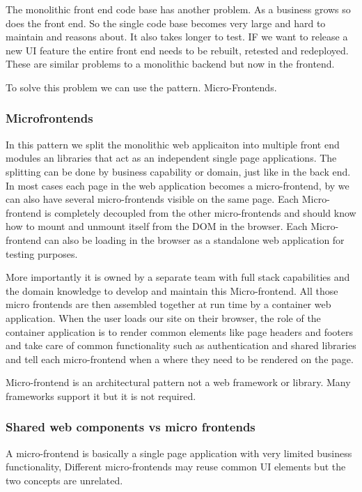 The monolithic front end code base has another problem.
As a business grows so does the front end.
So the single code base becomes very large and hard to maintain and reasons about.
It also takes longer to test.
IF we want to release a new UI feature the entire front end needs to be rebuilt, retested and redeployed.
These are similar problems to a monolithic backend but now in the frontend.

To solve this problem we can use the pattern.
Micro-Frontends.

\subsubsection{Microfrontends}
In this pattern we split the monolithic web applicaiton into multiple front end modules an libraries that act as an independent single page applications.
The splitting can be done by business capability or domain, just like in the back end.
In most cases each page in the web application becomes a micro-frontend, by we can also have several micro-frontends visible on the same page.
Each Micro-frontend is completely decoupled from the other micro-frontends and should know how to mount and unmount itself from the DOM in the browser.
Each Micro-frontend can also be loading in the browser as a standalone web application for testing purposes.

More importantly it is owned by a separate team with full stack capabilities and the domain knowledge to develop and maintain this Micro-frontend.
All those micro frontends are then assembled together at run time by a container web application.
When the user loads our site on their browser, the role of the container application is to render common elements like page headers and footers and take care of common functionality such as authentication and shared libraries and tell each micro-frontend when a where they need to be rendered on the page.

Micro-frontend is an architectural pattern not a web framework or library.
Many frameworks support it but it is not required.

\subsubsection{Shared web components vs micro frontends}
A micro-frontend is basically a single page application with very limited business functionality,
Different micro-frontends may reuse common UI elements but the two concepts are unrelated.

